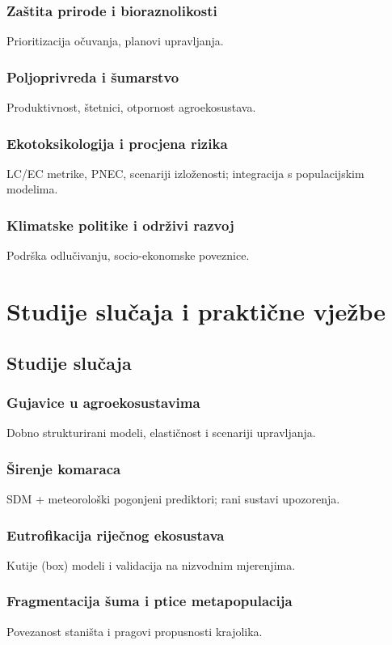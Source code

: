 \documentclass[11pt,oneside]{book}
\begin{document}
	\section{Zaštita prirode i bioraznolikosti}
	Prioritizacija očuvanja, planovi upravljanja.
	\section{Poljoprivreda i šumarstvo}
	Produktivnost, štetnici, otpornost agroekosustava.
	\section{Ekotoksikologija i procjena rizika}
	LC/EC metri\linebreak ke, PNEC, scenariji izloženosti; integracija s populacijskim modelima.
	\section{Klimatske politike i održivi razvoj}
	Podrška odlučivanju, socio-ekonomske poveznice.
	
	\part{Studije slučaja i praktične vježbe}
	
	\chapter{Studije slučaja}
	\section{Gujavice u agroekosustavima}
	Dobno strukturirani modeli, elastičnost i scenariji upravljanja.
	\section{Širenje komaraca}
	SDM + meteorološki pogonjeni prediktori; rani sustavi upozorenja.
	\section{Eutrofikacija riječnog ekosustava}
	Kutije (box) modeli i validacija na nizvodnim mjerenjima.
	\section{Fragmentacija šuma i ptice metapopulacija}
	Povezanost staništa i pragovi propusnosti krajolika.
\end{document}
